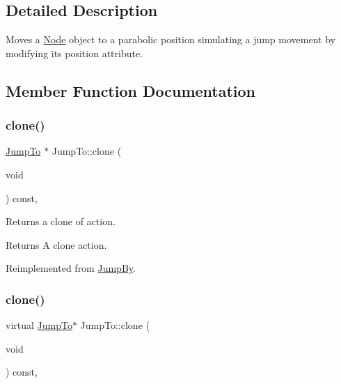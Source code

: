 \subsection{Detailed Description}
Moves a \hyperlink{classNode}{Node} object to a parabolic position simulating a jump movement by modifying it\textquotesingle{}s position attribute. 

\subsection{Member Function Documentation}
\mbox{\label{classJumpTo_a1ec85fd4b3d2190aee432923aea136c2}} 
\subsubsection{\texorpdfstring{clone()}{clone()}\hspace{0.1cm}{\footnotesize\ttfamily [1/2]}}
{\footnotesize\ttfamily \hyperlink{classJumpTo}{Jump\+To} $\ast$ Jump\+To\+::clone (\begin{DoxyParamCaption}\item[{void}]{ }\end{DoxyParamCaption}) const\hspace{0.3cm}{\ttfamily [override]}, {\ttfamily [virtual]}}

Returns a clone of action.

\begin{DoxyReturn}{Returns}
A clone action. 
\end{DoxyReturn}


Reimplemented from \hyperlink{classJumpBy_aea740cb701f25c7648c8eb24f71f6ba3}{Jump\+By}.

\mbox{\label{classJumpTo_aba7a2048b180db1b73224953dc42649e}} 
\subsubsection{\texorpdfstring{clone()}{clone()}\hspace{0.1cm}{\footnotesize\ttfamily [2/2]}}
{\footnotesize\ttfamily virtual \hyperlink{classJumpTo}{Jump\+To}$\ast$ Jump\+To\+::clone (\begin{DoxyParamCaption}\item[{void}]{ }\end{DoxyParamCaption}) const\hspace{0.3cm}{\ttfamily [override]}, {\ttfamily [virtual]}}

